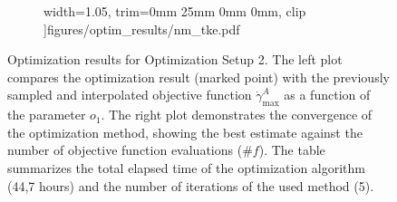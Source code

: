 \begin{figure}[H]
\begin{subfigure}{0.52\textwidth}
		width=1.05\textwidth,
		trim={0mm 25mm 0mm 0mm}, clip
		]{figures/optim_results/nm_tke.pdf}
	\end{subfigure}
	\vspace{2mm}
	\caption{Optimization results for Optimization Setup 2. The left plot compares the optimization result (marked point) with the previously sampled and interpolated objective function $\dot{\gamma}_{\text{max}}^{A}$ as a function of the parameter $o_1$. The right plot demonstrates the convergence of the optimization method, showing the best estimate against the number of objective function evaluations ($\# f$). The table summarizes the total elapsed time of the optimization algorithm (44,7 hours) and the number of iterations of the used method (5).}
\end{figure}
\newpage